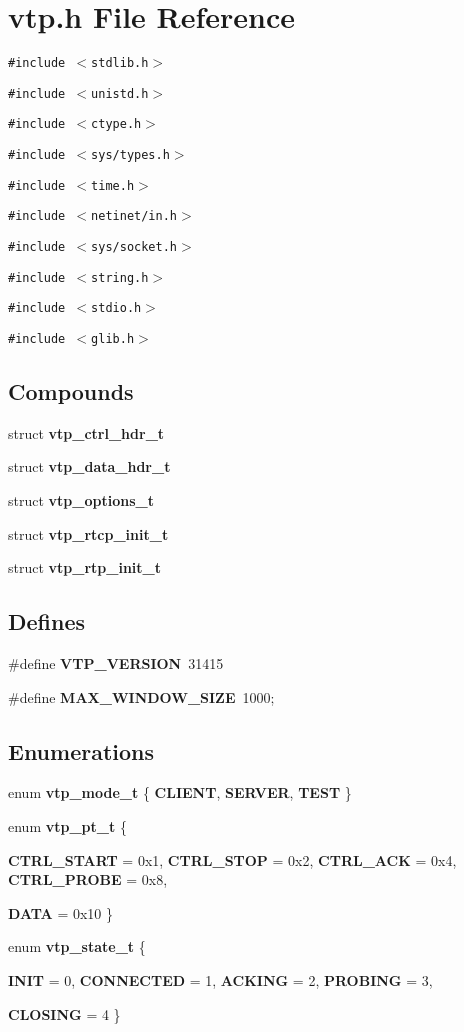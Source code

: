 \section{vtp.h File Reference}
\label{vtp_8h}
{\tt \#include $<$stdlib.h$>$}\par
{\tt \#include $<$unistd.h$>$}\par
{\tt \#include $<$ctype.h$>$}\par
{\tt \#include $<$sys/types.h$>$}\par
{\tt \#include $<$time.h$>$}\par
{\tt \#include $<$netinet/in.h$>$}\par
{\tt \#include $<$sys/socket.h$>$}\par
{\tt \#include $<$string.h$>$}\par
{\tt \#include $<$stdio.h$>$}\par
{\tt \#include $<$glib.h$>$}\par
\subsection*{Compounds}
\begin{CompactItemize}
\item 
struct {\bf vtp\_\-ctrl\_\-hdr\_\-t}
\item 
struct {\bf vtp\_\-data\_\-hdr\_\-t}
\item 
struct {\bf vtp\_\-options\_\-t}
\item 
struct {\bf vtp\_\-rtcp\_\-init\_\-t}
\item 
struct {\bf vtp\_\-rtp\_\-init\_\-t}
\end{CompactItemize}
\subsection*{Defines}
\begin{CompactItemize}
\item 
\#define {\bf VTP\_\-VERSION}\ 31415
\item 
\#define {\bf MAX\_\-WINDOW\_\-SIZE}\ 1000;
\end{CompactItemize}
\subsection*{Enumerations}
\begin{CompactItemize}
\item 
enum {\bf vtp\_\-mode\_\-t} \{ {\bf CLIENT}, 
{\bf SERVER}, 
{\bf TEST}
 \}
\item 
enum {\bf vtp\_\-pt\_\-t} \{ \par
{\bf CTRL\_\-START} =  0x1, 
{\bf CTRL\_\-STOP} =  0x2, 
{\bf CTRL\_\-ACK} =  0x4, 
{\bf CTRL\_\-PROBE} =  0x8, 
\par
{\bf DATA} =  0x10
 \}
\item 
enum {\bf vtp\_\-state\_\-t} \{ \par
{\bf INIT} =  0, 
{\bf CONNECTED} =  1, 
{\bf ACKING} =  2, 
{\bf PROBING} =  3, 
\par
{\bf CLOSING} =  4
 \}
\end{CompactItemize}
